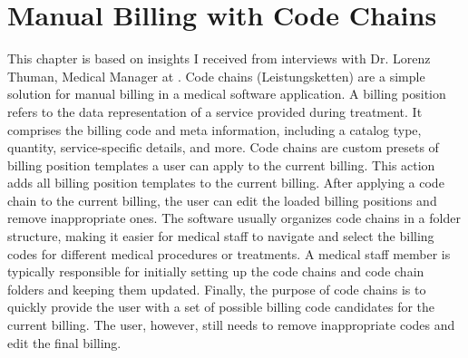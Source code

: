 \section{Manual Billing with Code Chains}\label{sec:billing-positions-and-code-chains}
This chapter is based on insights I received from interviews with Dr. Lorenz Thuman, Medical Manager at \AV.
Code chains (Leistungsketten) are a simple solution for manual billing in a medical software application.
A billing position refers to the data representation of a service provided during treatment.
It comprises the billing code and meta information, including a catalog type, quantity, service-specific details, and more.
Code chains are custom presets of billing position templates a user can apply to the current billing.
This action adds all billing position templates to the current billing.
After applying a code chain to the current billing, the user can edit the loaded billing positions and remove inappropriate ones.
The software usually organizes code chains in a folder structure,
making it easier for medical staff to navigate and select the billing codes for different medical procedures or treatments.
A medical staff member is typically responsible for initially setting up the code chains and code chain folders and keeping them updated.
Finally, the purpose of code chains is to quickly provide the user with a set of possible billing code candidates for the current billing.
The user, however, still needs to remove inappropriate codes and edit the final billing.




